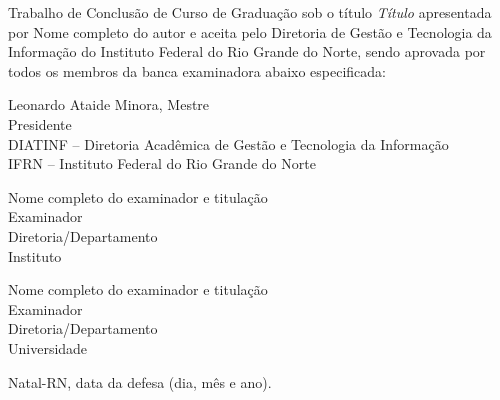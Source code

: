 \begin{folhadeaprovacao}
	\setlength{\ABNTsignthickness}{0.4pt}
	\setlength{\ABNTsignwidth}{10cm}

	\noindent
	Trabalho de Conclusão de Curso de Graduação sob o título
	\textit{Título} apresentada por Nome completo do autor e aceita pelo Diretoria
	de Gestão e Tecnologia da Informação do Instituto Federal do Rio Grande do
	Norte, sendo aprovada por todos os membros da banca examinadora abaixo especificada:

	\assinatura
	{
		Leonardo Ataide Minora, Mestre   			                  \\
		{\small Presidente}											          \smallskip\\
		{\footnotesize
			DIATINF -- Diretoria Acadêmica de Gestão e Tecnologia da Informação		   \\
		  	IFRN -- Instituto Federal do Rio Grande do Norte
		}
   }

   \assinatura
	{
      Nome completo do examinador e titulação   			                  \\
		{\small Examinador}											          \smallskip\\
		{\footnotesize
			Diretoria/Departamento		\\
		  	Instituto
		}
   }

   \assinatura
	{
      Nome completo do examinador e titulação   			                  \\
		{\small Examinador}											          \smallskip\\
		{\footnotesize
			Diretoria/Departamento		\\
		  	Universidade
		}
	}

	\vfill

	\begin{center}
		Natal-RN, data da defesa (dia, mês e ano).
	\end{center}
\end{folhadeaprovacao}
